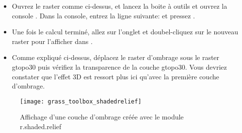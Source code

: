 {\begin{itemize}[label=--]
\item Ouvrez le raster  comme ci-dessus, et lancez la boite à outils \grass et ouvrez la console \grass. Dans la console, entrez la ligne suivante:\linebreak {} \linebreak et pressez .
\item Une fois le calcul terminé, allez sur l'onglet  et doubel-cliquez sur le nouveau raster  pour l'afficher dans \qg.
\item Comme expliqué ci-dessus, déplacez le raster d'ombrage sous le raster gtopo30 puis vérifiez la transparence de la couche gtopo30. Vous devriez constater que l'effet 3D est ressort plus ici qu'avec la première couche d'ombrage.
\end{itemize}

\begin{figure}[p]
 \begin{center}
 \texttt{[image: grass\_toolbox\_shadedrelief]}
  \caption{Affichage d'une couche d'ombrage créée avec le module \grass r.shaded.relief \nixcaption}\label{fig:grass_toolbox_shadedrelief}
 \end{center}
\end{figure}


}
